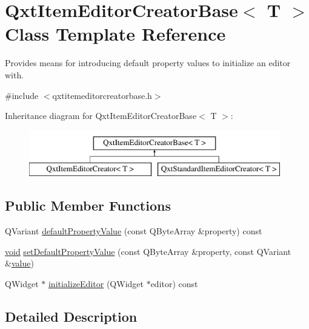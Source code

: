 \hypertarget{class_qxt_item_editor_creator_base}{\section{Qxt\-Item\-Editor\-Creator\-Base$<$ T $>$ Class Template Reference}
\label{class_qxt_item_editor_creator_base}
}


Provides means for introducing default property values to initialize an editor with.  




{\ttfamily \#include $<$qxtitemeditorcreatorbase.\-h$>$}

Inheritance diagram for Qxt\-Item\-Editor\-Creator\-Base$<$ T $>$\-:\begin{figure}[H]
\begin{center}
\leavevmode
\includegraphics[height=2.000000cm]{class_qxt_item_editor_creator_base}
\end{center}
\end{figure}
\subsection*{Public Member Functions}
\begin{DoxyCompactItemize}
\item 
Q\-Variant \hyperlink{class_qxt_item_editor_creator_base_af9343345c82d268d5e42e4e15172b50b}{default\-Property\-Value} (const Q\-Byte\-Array \&property) const 
\item 
\hyperlink{group___u_a_v_objects_plugin_ga444cf2ff3f0ecbe028adce838d373f5c}{void} \hyperlink{class_qxt_item_editor_creator_base_a2864edf86fe3807916d7db88db899f13}{set\-Default\-Property\-Value} (const Q\-Byte\-Array \&property, const Q\-Variant \&\hyperlink{glext_8h_aa0e2e9cea7f208d28acda0480144beb0}{value})
\item 
Q\-Widget $\ast$ \hyperlink{class_qxt_item_editor_creator_base_a4fba37c4a27d5c4a404e0bf73f75f509}{initialize\-Editor} (Q\-Widget $\ast$editor) const 
\end{DoxyCompactItemize}


\subsection{Detailed Description}
